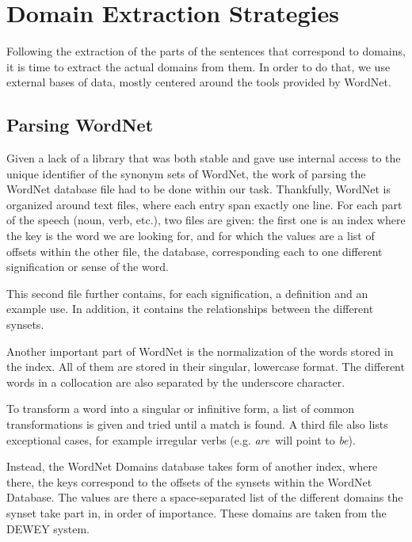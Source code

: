 \section{Domain Extraction Strategies} %
\label{sec:domain_extraction_strategies}

Following the extraction of the parts of the sentences that correspond to domains, it is time to extract the actual domains from them. In order to do that, we use external bases of data, mostly centered around the tools provided by WordNet.

\subsection{Parsing WordNet} %
\label{sub:parsing_wordnet}

Given a lack of a library that was both stable and gave use internal access to the unique identifier of the synonym sets of WordNet, the work of parsing the WordNet database file had to be done within our task. Thankfully, WordNet is organized around text files, where each entry span exactly one line. For each part of the speech (noun, verb, etc.), two files are given: the first one is an index where the key is the word we are looking for, and for which the values are a list of offsets within the other file, the database, corresponding each to one different signification or sense of the word.

This second file further contains, for each signification, a definition and an example use. In addition, it contains the relationships between the different synsets.

Another important part of WordNet is the normalization of the words stored in the index. All of them are stored in their singular, lowercase format. The different words in a collocation are also separated by the underscore character.

To transform a word into a singular or infinitive form, a list of common transformations is given and tried until a match is found. A third file also lists exceptional cases, for example irregular verbs (e.g. \emph{are}\ will point to \emph{be}).

Instead, the WordNet Domains database takes form of another index, where there, the keys correspond to the offsets of the synsets within the WordNet Database. The values are there a space-separated list of the different domains the synset take part in, in order of importance. These domains are taken from the DEWEY system.

